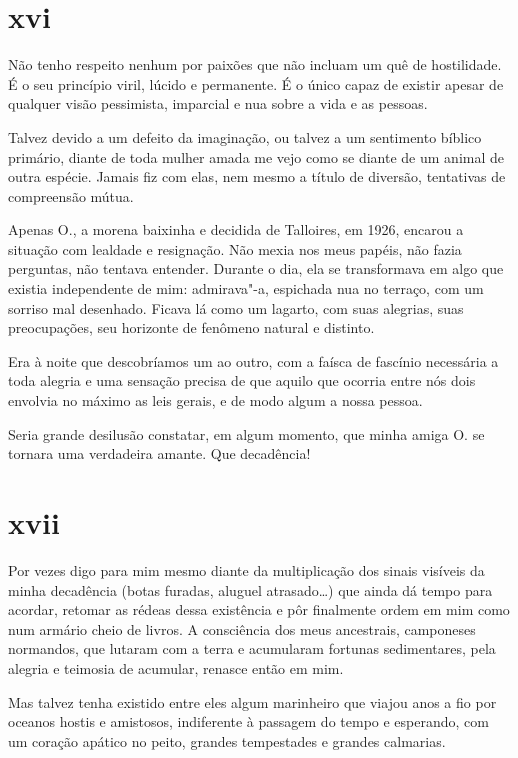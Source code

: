 \section{xvi}

Não tenho respeito nenhum por paixões que não incluam um quê de
hostilidade. É o seu princípio viril, lúcido e permanente. É o único
capaz de existir apesar de qualquer visão pessimista, imparcial e nua
sobre a vida e as pessoas.

Talvez devido a um defeito da imaginação, ou talvez a um
sentimento bíblico primário, diante de toda mulher amada me vejo como
se diante de um animal de outra espécie. Jamais fiz com elas, nem mesmo
a título de diversão, tentativas de compreensão mútua.

Apenas O., a morena baixinha e decidida de Talloires, em 1926, encarou a
situação com lealdade e resignação. Não mexia nos meus papéis, não fazia
perguntas, não tentava entender. Durante o dia, ela se transformava em
algo que existia independente de mim: admirava"-a, espichada nua no
terraço, com um sorriso mal desenhado. Ficava lá como um lagarto, com
suas alegrias, suas preocupações, seu horizonte de fenômeno natural e
distinto.

Era à noite que descobríamos um ao outro, com a faísca de fascínio
necessária a toda alegria e uma sensação precisa de que aquilo que
ocorria entre nós dois envolvia no máximo as leis gerais, e de modo
algum a nossa pessoa.

Seria grande desilusão constatar, em algum momento, que minha amiga
O. se tornara uma verdadeira amante. Que decadência!

\section{xvii}

Por vezes digo para mim mesmo diante da multiplicação dos
sinais visíveis da minha decadência (botas furadas, aluguel
atrasado\ldots{}) que ainda dá tempo para acordar, retomar as rédeas
dessa existência e pôr finalmente ordem em mim como num armário cheio de
livros. A consciência dos meus ancestrais, camponeses normandos, que
lutaram com a terra e acumularam fortunas sedimentares, pela alegria e
teimosia de acumular, renasce então em mim.

Mas talvez tenha existido entre eles algum marinheiro que viajou anos a
fio por oceanos hostis e amistosos, indiferente à passagem do tempo e
esperando, com um coração apático no peito, grandes tempestades e
grandes calmarias.


